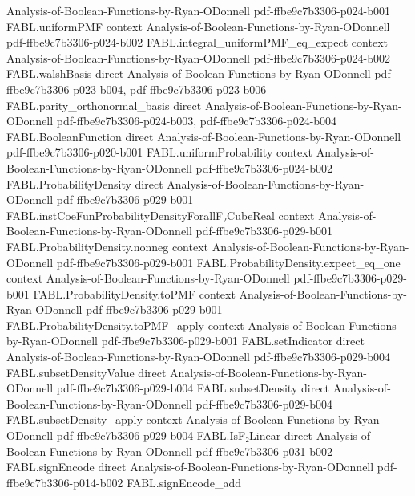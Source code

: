 \begin{theorem}
  {Analysis-of-Boolean-Functions-by-Ryan-ODonnell}
  {pdf-ffbe9c7b3306-p024-b001}
\proofstep
  {FABL.uniformPMF}
  {context}
  {Analysis-of-Boolean-Functions-by-Ryan-ODonnell}
  {pdf-ffbe9c7b3306-p024-b002}
\proofstep
  {FABL.integral_uniformPMF_eq_expect}
  {context}
  {Analysis-of-Boolean-Functions-by-Ryan-ODonnell}
  {pdf-ffbe9c7b3306-p024-b002}
\proofstep
  {FABL.walshBasis}
  {direct}
  {Analysis-of-Boolean-Functions-by-Ryan-ODonnell}
  {pdf-ffbe9c7b3306-p023-b004,
    pdf-ffbe9c7b3306-p023-b006}
\proofstep
  {FABL.parity_orthonormal_basis}
  {direct}
  {Analysis-of-Boolean-Functions-by-Ryan-ODonnell}
  {pdf-ffbe9c7b3306-p024-b003,
    pdf-ffbe9c7b3306-p024-b004}
\proofstep
  {FABL.BooleanFunction}
  {direct}
  {Analysis-of-Boolean-Functions-by-Ryan-ODonnell}
  {pdf-ffbe9c7b3306-p020-b001}
\proofstep
  {FABL.uniformProbability}
  {context}
  {Analysis-of-Boolean-Functions-by-Ryan-ODonnell}
  {pdf-ffbe9c7b3306-p024-b002}
\proofstep
  {FABL.ProbabilityDensity}
  {direct}
  {Analysis-of-Boolean-Functions-by-Ryan-ODonnell}
  {pdf-ffbe9c7b3306-p029-b001}
\proofstep
  {FABL.instCoeFunProbabilityDensityForallF₂CubeReal}
  {context}
  {Analysis-of-Boolean-Functions-by-Ryan-ODonnell}
  {pdf-ffbe9c7b3306-p029-b001}
\proofstep
  {FABL.ProbabilityDensity.nonneg}
  {context}
  {Analysis-of-Boolean-Functions-by-Ryan-ODonnell}
  {pdf-ffbe9c7b3306-p029-b001}
\proofstep
  {FABL.ProbabilityDensity.expect_eq_one}
  {context}
  {Analysis-of-Boolean-Functions-by-Ryan-ODonnell}
  {pdf-ffbe9c7b3306-p029-b001}
\proofstep
  {FABL.ProbabilityDensity.toPMF}
  {context}
  {Analysis-of-Boolean-Functions-by-Ryan-ODonnell}
  {pdf-ffbe9c7b3306-p029-b001}
\proofstep
  {FABL.ProbabilityDensity.toPMF_apply}
  {context}
  {Analysis-of-Boolean-Functions-by-Ryan-ODonnell}
  {pdf-ffbe9c7b3306-p029-b001}
\proofstep
  {FABL.setIndicator}
  {direct}
  {Analysis-of-Boolean-Functions-by-Ryan-ODonnell}
  {pdf-ffbe9c7b3306-p029-b004}
\proofstep
  {FABL.subsetDensityValue}
  {direct}
  {Analysis-of-Boolean-Functions-by-Ryan-ODonnell}
  {pdf-ffbe9c7b3306-p029-b004}
\proofstep
  {FABL.subsetDensity}
  {direct}
  {Analysis-of-Boolean-Functions-by-Ryan-ODonnell}
  {pdf-ffbe9c7b3306-p029-b004}
\proofstep
  {FABL.subsetDensity_apply}
  {context}
  {Analysis-of-Boolean-Functions-by-Ryan-ODonnell}
  {pdf-ffbe9c7b3306-p029-b004}
\proofstep
  {FABL.IsF₂Linear}
  {direct}
  {Analysis-of-Boolean-Functions-by-Ryan-ODonnell}
  {pdf-ffbe9c7b3306-p031-b002}
\proofstep
  {FABL.signEncode}
  {direct}
  {Analysis-of-Boolean-Functions-by-Ryan-ODonnell}
  {pdf-ffbe9c7b3306-p014-b002}
\proofstep
  {FABL.signEncode_add}

\end{theorem}

